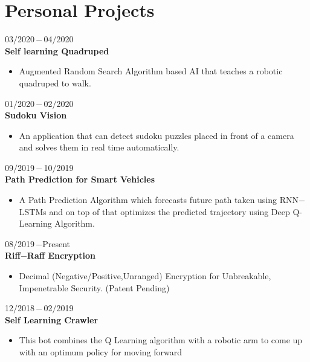 \documentclass[a4paper, 12pt]{article}
\begin{document}
    
    \section*{Personal Projects}
    \begin{flushleft}
    	03$/$2020\,$-$\,04$/$2020\\
    	\textbf{Self learning Quadruped}
    	\begin{itemize}
    		\item Augmented Random Search Algorithm based AI that teaches a robotic quadruped to walk.
    	\end{itemize}
    \end{flushleft}
    \begin{flushleft}
    	01$/$2020\,$-$\,02$/$2020\\
    	\textbf{Sudoku Vision}
    	\begin{itemize}
    		\item An application that can detect sudoku puzzles placed in front of a camera and solves them in real time automatically.
    	\end{itemize}
    \end{flushleft}
    \begin{flushleft}
    	09$/$2019\,$-$\,10$/$2019\\
    	\textbf{Path Prediction for Smart Vehicles}
    	\begin{itemize}
    		\item A Path Prediction Algorithm which forecasts future path taken using RNN$-$LSTMs and on top
of that optimizes the predicted trajectory using Deep Q-Learning Algorithm.
    	\end{itemize}
    \end{flushleft}
    
    \begin{flushleft}
    	08$/$2019\,$-$Present\\
    	\textbf{Riff$-$Raff Encryption}
    	\begin{itemize}
    		\item Decimal (Negative/Positive,Unranged) Encryption for Unbreakable, Impenetrable Security. (Patent Pending)
    	\end{itemize}
    \end{flushleft}
    
    \begin{flushleft}
    	12$/$2018\,$-$\,02$/$2019\\
    	\textbf{Self Learning Crawler}
    	\begin{itemize}
    		\item This bot combines the Q Learning algorithm with a robotic arm to come up with an optimum
policy for moving forward
    	\end{itemize}
    \end{flushleft}
    
\end{document}
